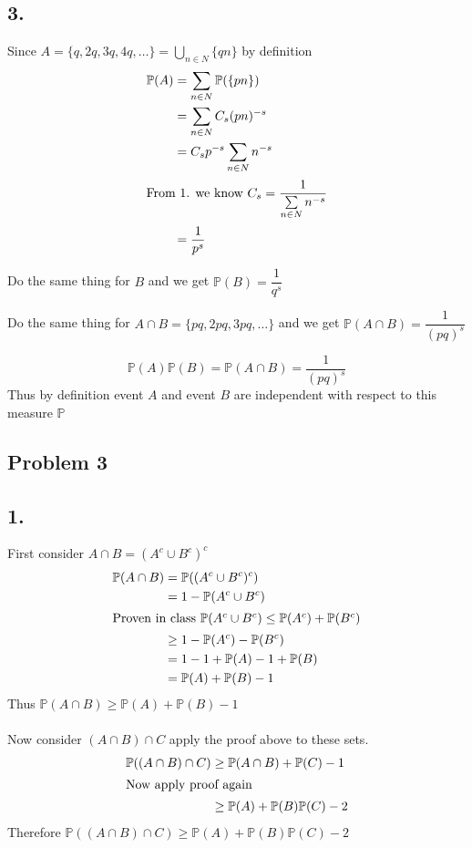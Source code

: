 \documentclass[12pt, letterpaper]{article}
\theoremstyle{definition}
\renewcommand{\P}{\mathbb{P}}
\begin{document}
\subsection*{3.}
Since  $A=\{q,2q,3q,4q,\dots\}=\bigcup\limits_{n \in N}\{qn\}$ by definition
\begin{align*}
    \P(A)
    &=\sum\limits_{n \in N}\P(\{pn\})\\
    &=\sum\limits_{n \in N}C_s(pn)^{-s}\\
    &=C_sp^{-s}\sum\limits_{n \in N}n^{-s}\\ \intertext{From 1. we know $C_s=\dfrac{1}{\sum\limits_{n \in N}n^{-s}}$} 
    &=\dfrac{1}{p^{s}}
\end{align*}

Do the same thing for $B$ and we get $\P(B)=\dfrac{1}{q^s}$

Do the same thing for $A\cap B = \{pq,2pq,3pq,\dots\}$ and we get $\P(A\cap B)=\dfrac{1}{(pq)^s}$

\[\P(A)\P(B)=\P(A\cap B)=\dfrac{1}{(pq)^s}\]
Thus by definition event $A$ and event $B$ are independent with respect to this measure $\P$

\newpage
\subsection*{Problem 3}
\subsection*{1.}
First consider $A \cap B=(A^c \cup B^c)^c$
\begin{align*}
    \P(A\cap B)&=\P((A^c \cup B^c)^c)\\
               &=1-\P(A^c \cup B^c)\\ \intertext{Proven in class $\P(A^c \cup B^c) \leq \P(A^c)+\P(B^c)$}
               &\geq 1-\P(A^c)-\P(B^c)\\
               &= 1-1+\P(A)-1+\P(B)\\
               &=\P(A)+\P(B)-1
\end{align*}
Thus $\P(A\cap B) \geq \P(A)+\P(B)-1$\\
\phantom{text}\\
Now consider $(A\cap B)\cap C$ apply the proof above to these sets.
\begin{align*}
    \P((A\cap B)\cap C)&\geq \P(A\cap B) + \P(C)-1\\ \intertext{Now apply proof again}
    &\geq \P(A)+\P(B)\P(C)-2
\end{align*}
Therefore $\P((A\cap B)\cap C)\geq\P(A)+\P(B)\P(C)-2$
\end{document}
